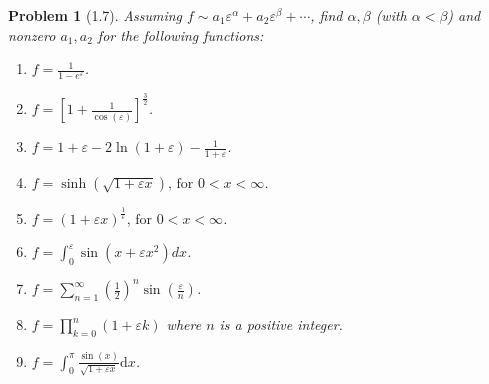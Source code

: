 \documentclass[11pt]{article}
\newcommand{\vep}{\varepsilon}
\theoremstyle{problemstyle}
\newtheorem{problem}{Problem}
\begin{document}
\newpage
\begin{problem}[1.7]
Assuming $f \sim a_1 \vep^\alpha + a_2 \vep^\beta + \cdots$, find $\alpha, \beta$
(with $\alpha < \beta$) and nonzero $a_1, a_2$ for the following functions:
\begin{enumerate}
  \item $\displaystyle f = \frac{1}{1 - e^{\vep}}$.
  \item $\displaystyle f = \left[1 + \frac{1}{\cos(\vep)}\right]^{\frac{3}{2}}$.
  \item $\displaystyle f = 1 + \vep - 2\ln\left(1 + \vep\right) - \frac{1}{1 + \vep}$.
  \item $\displaystyle f = \sinh\left(\sqrt{1 + \vep x}\right) \text{, for } 0 < x < \infty$.
  \item $\displaystyle f = \left(1 + \vep x\right)^{\frac{1}{\vep}} \text{, for } 0 < x < \infty$.
  \item $\displaystyle f = \int_{0}^{\vep} \sin\left(x + \vep x^{2}\right)dx$.
  \item $\displaystyle f = \displaystyle \sum_{n=1}^{\infty} \left(\frac{1}{2}\right)^n 
              \sin\left(\frac{\vep}{n}\right)$.
  \item $\displaystyle f = \prod_{k=0}^{n} (1 + \varepsilon k)$ where $n$ is a positive integer.
  \item $\displaystyle f = \int_0^\pi \frac{\sin(x)}{\sqrt{1 + \vep x}} \mathrm{d}x$.
\end{enumerate}
\end{problem}
\end{document}
